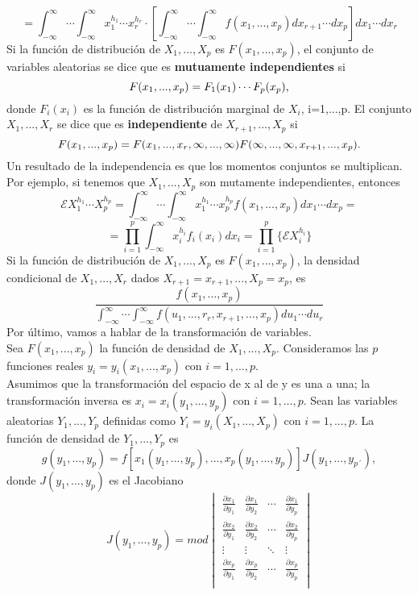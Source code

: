 \[ = \int_{-\infty}^{\infty} \dotsb \int_{-\infty}^{\infty} x_{1}^{h_{1}} \dotsb x_{r}^{h_{r}} · \left[ \int_{-\infty}^{\infty} \dotsb \int_{-\infty}^{\infty} f(x_{1},...,x_{p})dx_{r+1} \dotsb dx_{p} \right] dx_{1} \dotsb dx_{r} \]
Si la función de distribución de $X_{1},...,X_{p}$ es $F(x_{1},...,x_{p})$, el conjunto de variables aleatorias se dice que es \textbf{mutuamente independientes} si
\[ F(x_{1},...,x_{p})=F_{1}(x_{1}) \dotsb F_{p}(x_{p}) \textnormal{,} \]
donde $F_{i}(x_{i})$ es la función de distribución marginal de $X_{i}$, i=1,...,p. El conjunto $X_{1},...,X_{r}$ se dice que es \textbf{independiente} de $X_{r+1},...,X_{p}$ si
\[ F(x_{1},...,x_{p})=F(x_{1},...,x_{r},\infty,...,\infty) F(\infty,...,\infty, x_{r+1},...,x_{p}) \textnormal{.}\]
Un resultado de la independencia es que los momentos conjuntos se multiplican. Por ejemplo, si tenemos que $X_{1},...,X_{p}$ son mutamente independientes, entonces
\[ \mathcal{E} X_{1}^{h_{1}} \dotsb X_{p}^{h_{p}} = \int_{-\infty}^{\infty} \dotsb \int_{-\infty}^{\infty} x_{1}^{h_{1}} \dotsb x_{p}^{h_{p}} f(x_{1},...,x_{p})dx_{1} \dotsb dx_{p}= \]
\[ = \prod_{i=1}^{p} \int_{-\infty}^{\infty} x_{i}^{h_{i}} f_{i}(x_{i}) dx_{i} = \prod_{i=1}^{p} \lbrace \mathcal{E} X_{i}^{h_{i}} \rbrace \]
Si la función de distribución de $X_{1},...,X_{p}$ es $F(x_{1},...,x_{p})$, la densidad condicional de $X_{1},...,X_{r}$ dados $X_{r+1}=x_{r+1},...,X_{p}=x_{p}$, es
\[ \frac{f(x_{1},...,x_{p})}{\int_{-\infty}^{\infty} \dotsb \int_{-\infty}^{\infty} f(u_{1},...,r_{r},x_{r+1},...,x_{p})du_{1} \dotsb du_{r}} \]
Por último, vamos a hablar de la transformación de variables.\\
Sea $F(x_{1},...,x_{p})$ la función de densidad de $X_{1},...,X_{p}$. Consideramos las $p$ funciones reales $y_{i}=y_{i}(x_{1},...,x_{p})$ con $i=1,...,p$.\\
Asumimos que la transformación del espacio de x al de y es una a una; la transformación inversa es $x_{i}=x_{i}(y_{1},...,y_{p})$ con $i=1,...,p$.
Sean las variables aleatorias $Y_{1},...,Y_{p}$ definidas como $Y_{i}=y_{i}(X_{1},...,X_{p})$ con $i=1,...,p$. La función de densidad de $Y_{1},...,Y_{p}$ es
\[ g(y_{1},...,y_{p})=f[x_{1}(y_{1},...,y_{p}),...,x_{p}(y_{1},...,y_{p})]J(y_{1},...,y_{p´}), \]
donde $J(y_{1},...,y_{p})$ es el Jacobiano
\begin{equation}
		\renewcommand\arraystretch{2}
        J(y_{1},...,y_{p}) = mod \begin{vmatrix}
            \frac{\partial x_{1}}{\partial y_{1}} & \frac{\partial x_{1}}{\partial y_{2}} & \cdots & \frac{\partial x_{1}}{\partial y_{p}} \\
            \frac{\partial x_{2}}{\partial y_{1}} &\frac{\partial x_{2}}{\partial y_{2}} & \cdots & \frac{\partial x_{2}}{\partial y_{p}} \\
            \vdots & \vdots & \ddots & \vdots \\
            \frac{\partial x_{p}}{\partial y_{1}} & \frac{\partial x_{p}}{\partial y_{2}} & \cdots & \frac{\partial x_{p}}{\partial y_{p}} \\
        \end{vmatrix}
    \end{equation}
